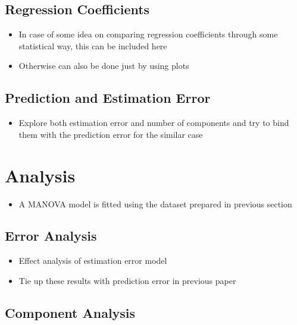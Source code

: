 \documentclass[12pt,3p,authoryear]{elsarticle}
\providecommand{\tightlist}{%
  \setlength{\itemsep}{0pt}\setlength{\parskip}{0pt}}
\begin{document}
\subsection{Regression Coefficients}\label{regression-coefficients}

\begin{itemize}
\tightlist
\item
  In case of some idea on comparing regression coefficients through some
  statistical way, this can be included here
\item
  Otherwise can also be done just by using plots
\end{itemize}

\subsection{Prediction and Estimation
Error}\label{prediction-and-estimation-error}

\begin{itemize}
\tightlist
\item
  Explore both estimation error and number of components and try to bind
  them with the prediction error for the similar case
\end{itemize}

\section{Analysis}\label{analysis}

\begin{itemize}
\tightlist
\item
  A MANOVA model is fitted using the dataset prepared in previous
  section
\end{itemize}

\subsection{Error Analysis}\label{error-analysis}

\begin{itemize}
\tightlist
\item
  Effect analysis of estimation error model
\item
  Tie up these results with prediction error in previous paper
\end{itemize}

\subsection{Component Analysis}\label{component-analysis}
\end{document}
